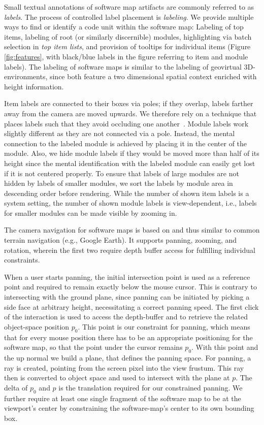 \documentclass[annual]{acmsiggraph}
\newcommand{\scite}[1]{~\cite{#1}}
\begin{document}
Small textual annotations of software map artifacts are commonly referred to as \emph{labels}.
The process of controlled label placement is \emph{labeling}.
We provide multiple ways to find or identify a code unit within the software map: 
Labeling of top items, labeling of root (or similarly discernible) modules, highlighting via batch selection in \emph{top item lists}, and provision of tooltips for individual items (Figure \ref{fig:features}, with black/blue labels in the figure referring to item and module labels).
The labeling of software maps is similar to the labeling of geovirtual 3D-environments, since both feature a two dimensional spatial context enriched with height information. 

Item labels are connected to their boxes via poles; if they overlap, labels farther away from the camera are moved upwards.
We therefore rely on a technique that places labels such that they avoid occluding one another\scite{Hagedorn2007}.
Module labels work slightly different as they are not connected via a pole.
Instead, the mental connection to the labeled module is achieved by placing it in the center of the module.
Also, we hide module labels if they would be moved more than half of its height since the mental identification with the labeled module can easily get lost if it is not centered properly.
To ensure that labels of large modules are not hidden by labels of smaller modules, we sort the labels by module area in descending order before rendering.
While the number of shown item labels is a system setting, the number of shown module labels is view-dependent, i.e., labels for smaller modules can be made visible by zooming in.

The camera navigation for software maps is based on and thus similar to common terrain navigation (e.g., Google Earth).
It supports panning, zooming, and rotation, wherein the first two require depth buffer access for fulfilling individual constraints.

When a user starts panning, the initial intersection point is used as a reference point and required to remain exactly below the mouse cursor.
This is contrary to intersecting with the ground plane, since panning can be initiated by picking a side face at arbitrary height, necessitating a correct panning speed.
The first click of the interaction is used to access the depth-buffer and to retrieve the related object-space position $p_0$.
This point is our constraint for panning, which means that for every mouse position there has to be an appropriate positioning for the software map, so that the point under the cursor remains $p_0$.
With this point and the up normal we build a plane, that defines the panning space.
For panning, a ray is created, pointing from the screen pixel into the view frustum.
This ray then is converted to object space and used to intersect with the plane at $p$.
The delta of $p_0$ and $p$ is the translation required for our constrained panning.
We further require at least one single fragment of the software map to be at the viewport's center by constraining the software-map's center to its own bounding box.
\end{document}
